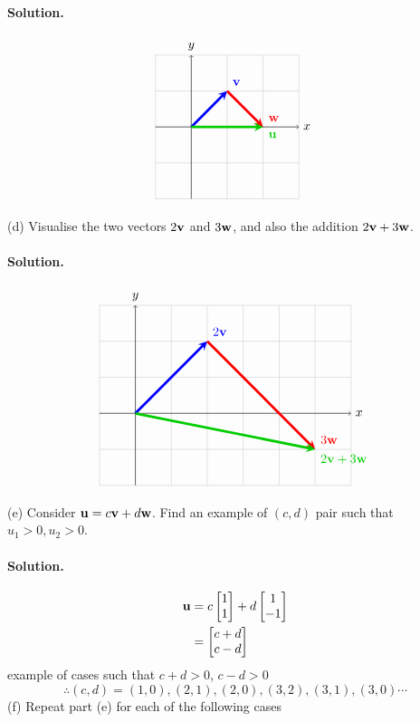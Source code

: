 \paragraph{Solution.}
\begin{align*}
\begin{tikzpicture}
    \draw[thin,gray!40] (-1,-2) grid (3,2);
    \draw[->] (-1,0)--(3,0) node[right]{$x$};
    \draw[->] (0,-2)--(0,2) node[above]{$y$};
    \draw[line width=2pt,blue,-stealth](0,0)--(1,1) node[anchor=south west]{$\vb{v}$};
    \draw[line width=2pt,red,-stealth](1,1)--(2,0) node[anchor=south west]{$\vb{w}$};
    \draw[line width=2pt,black!20!green,-stealth](0,0)--(2,0) node[anchor=north west]{$\vb{u}$};
\end{tikzpicture}
\end{align*}

(d) Visualise the two vectors $2\vb{v}$ and $3\vb{w}$, and also the addition $2\vb{v} + 3\vb{w}$.
\paragraph{Solution.}
\begin{align*}
\begin{tikzpicture}
    \draw[thin,gray!40] (-1,-2) grid (6,3);
    \draw[->] (-1,0)--(6,0) node[right]{$x$};
    \draw[->] (0,-2)--(0,3) node[above]{$y$};
    \draw[line width=2pt,blue,-stealth](0,0)--(2,2) node[anchor=south west]{$2\vb{v}$};
    \draw[line width=2pt,red,-stealth](2,2)--(5,-1) node[anchor=south west]{$3\vb{w}$};
    \draw[line width=2pt,black!20!green,-stealth](0,0)--(5,-1) node[anchor=north west]{$2\vb{v}+3\vb{w}$};
\end{tikzpicture}
\end{align*}

(e) Consider $\vb{u} = c\vb{v} + d\vb{w}$. Find an example of $(c, d)$ pair such that $u_1>0, u_2>0$.
\paragraph{Solution.}
\begin{align*}
    \vb{u} &= c\begin{bmatrix}
        1\\1
    \end{bmatrix} + d\begin{bmatrix}
        1\\-1
    \end{bmatrix}\\
    &= \begin{bmatrix}
        c+d\\c-d
    \end{bmatrix}
\end{align*}
example of cases such that $c+d > 0$, $c-d > 0$\\
$$\therefore (c, d) = (1, 0), (2, 1), (2, 0), (3, 2), (3, 1), (3, 0) \cdots$$
\newpage
(f) Repeat part (e) for each of the following cases
